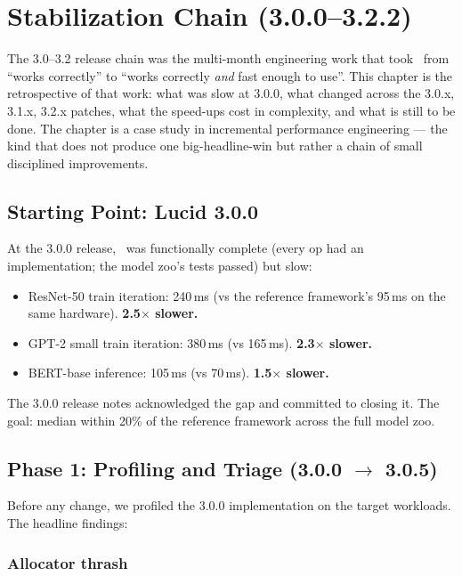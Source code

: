 \chapter{Stabilization Chain (3.0.0--3.2.2)}
\label{ch:stabilization}

The 3.0--3.2 release chain was the multi-month engineering work
that took \Lucid\ from ``works correctly'' to ``works correctly
\emph{and} fast enough to use''. This chapter is the retrospective
of that work: what was slow at 3.0.0, what changed across the
3.0.x, 3.1.x, 3.2.x patches, what the speed-ups cost in
complexity, and what is still to be done. The chapter is a
case study in incremental performance engineering --- the kind
that does not produce one big-headline-win but rather a chain
of small disciplined improvements.

\section{Starting Point: Lucid 3.0.0}
\label{sec:stabilization:starting_point}

At the 3.0.0 release, \Lucid\ was functionally complete (every
op had an implementation; the model zoo's tests passed) but
slow:

\begin{itemize}
  \item ResNet-50 train iteration: 240\,ms (vs the reference
    framework's 95\,ms on the same hardware). \textbf{2.5$\times$
    slower.}
  \item GPT-2 small train iteration: 380\,ms (vs 165\,ms).
    \textbf{2.3$\times$ slower.}
  \item BERT-base inference: 105\,ms (vs 70\,ms).
    \textbf{1.5$\times$ slower.}
\end{itemize}

The 3.0.0 release notes acknowledged the gap and committed to
closing it. The goal: median within 20\% of the reference
framework across the full model zoo.

\section{Phase 1: Profiling and Triage (3.0.0 $\to$ 3.0.5)}
\label{sec:stabilization:phase_1}

Before any change, we profiled the 3.0.0 implementation on the
target workloads. The headline findings:

\subsection{Allocator thrash}
\label{ssec:stabilization:allocator_thrash}

